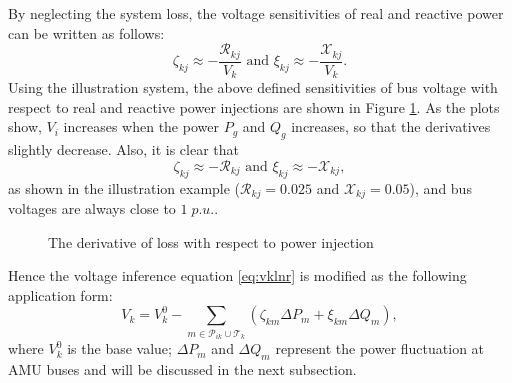 \documentclass{article}
\begin{document}
By neglecting the system loss, the voltage sensitivities of real and reactive power can be written as follows:
\begin{equation}
    \zeta_{kj} \approx -\frac{\mathcal{R}_{kj}}{V_k} \text{ and } \xi_{kj}\approx -\frac{\mathcal{X}_{kj}}{V_k}. \label{eq:zxv}
\end{equation}
Using the illustration system, the above defined sensitivities of bus voltage with respect to real and reactive power injections are shown in Figure \ref{fig:dvdpq}. As the plots show, $V_i$ increases when the power $P_g$ and $Q_g$ increases, so that the derivatives slightly decrease. Also, it is clear that
\begin{equation}
 \zeta_{kj} \approx -\mathcal{R}_{kj} \text{ and } \xi_{kj}\approx -\mathcal{X}_{kj},   \label{eq:zetaxi}
\end{equation}
as shown in the illustration example ($\mathcal{R}_{kj}=0.025$ and $\mathcal{X}_{kj}=0.05$), and bus voltages are always close to $1\;p.u.$.
 \begin{figure}[ht]
    \centering
    \quad
    \caption{The derivative of loss with respect to power injection}
    \label{fig:dvdpq}
\end{figure}

Hence the voltage inference equation \eqref{eq:vklnr} is modified as the following application form:
\begin{equation}
   V_k=    V_k^0 -\sum_{ m \in\mathcal{P}_{ik}\cup \mathcal{T}_k} (\zeta_{km}\Delta P_m+ \xi_{km} \Delta Q_m),  \label{eq:vklvr-r}
\end{equation}
where $ V_k^0$ is the base value; $\Delta P_m$ and $\Delta Q_m$ represent the power fluctuation at AMU buses and will be discussed in the next subsection.
\end{document}
